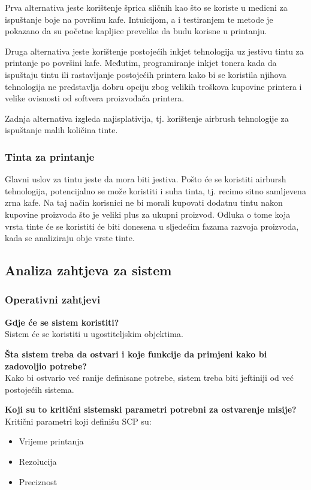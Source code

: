\documentclass[12pt]{article}
\begin{document}
Prva alternativa jeste korištenje šprica sličnih kao što se koriste u medicni za ispuštanje boje na površinu kafe. Intuicijom, a i testiranjem te metode je pokazano da su početne kapljice prevelike da budu korisne u printanju.

Druga alternativa jeste korištenje postojećih inkjet tehnologija uz jestivu tintu za printanje po površini kafe. Međutim, programiranje inkjet tonera kada da ispuštaju tintu ili rastavljanje postojećih printera kako bi se koristila njihova tehnologija ne predstavlja dobru opciju zbog velikih troškova kupovine printera i velike ovisnosti od softvera proizvođača printera.

Zadnja alternativa izgleda najisplativija, tj. korištenje airbrush tehnologije za ispuštanje malih količina tinte. 

\subsubsection{Tinta za printanje}

Glavni uslov za tintu jeste da mora biti jestiva. Pošto će se koristiti airbursh tehnologija, potencijalno se može koristiti i suha tinta, tj. recimo sitno samljevena zrna kafe. Na taj način korisnici ne bi morali kupovati dodatnu tintu nakon kupovine proizvoda što je veliki plus za ukupni proizvod. Odluka o tome koja vrsta tinte će se koristiti će biti donesena u sljedećim fazama razvoja proizvoda, kada se analiziraju obje vrste tinte.

\subsection{Analiza zahtjeva za sistem}
\subsubsection{Operativni zahtjevi}

\textbf{Gdje će se sistem koristiti?}\\
Sistem će se koristiti u ugostiteljskim objektima. 

\textbf{Šta sistem treba da ostvari i koje funkcije da primjeni kako bi zadovoljio potrebe?}\\
Kako bi ostvario već ranije definisane potrebe, sistem treba biti jeftiniji od već postojećih sistema.

\textbf{Koji su to kritični sistemski parametri potrebni za ostvarenje misije?}\\
Kritični parametri koji definišu SCP su:
\begin{itemize}
\item Vrijeme printanja
\item Rezolucija
\item Preciznost
\end{itemize}
\end{document}
